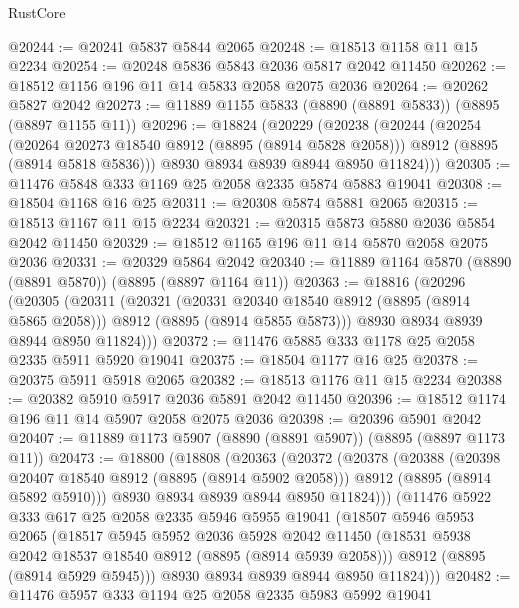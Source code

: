 \begin{lexlean}{RustCore}
\begin{coremodule}
@20244 := @20241 @5837 @5844 @2065
@20248 := @18513 @1158 @11 @15 @2234
@20254 := @20248 @5836 @5843 @2036 @5817 @2042 @11450
@20262 := @18512 @1156 @196 @11 @14 @5833 @2058 @2075 @2036
@20264 := @20262 @5827 @2042
@20273 := @11889 @1155 @5833 (@8890 (@8891 @5833)) (@8895 (@8897 @1155 @11))
@20296 := @18824
    (@20229
      (@20238
        (@20244
          (@20254
            (@20264 @20273 @18540 @8912 (@8895 (@8914 @5828 @2058)))
            @8912
            (@8895 (@8914 @5818 @5836)))
          @8930
          @8934
          @8939
          @8944
          @8950
          @11824)))
@20305 := @11476 @5848 @333 @1169 @25 @2058 @2335 @5874 @5883 @19041
@20308 := @18504 @1168 @16 @25
@20311 := @20308 @5874 @5881 @2065
@20315 := @18513 @1167 @11 @15 @2234
@20321 := @20315 @5873 @5880 @2036 @5854 @2042 @11450
@20329 := @18512 @1165 @196 @11 @14 @5870 @2058 @2075 @2036
@20331 := @20329 @5864 @2042
@20340 := @11889 @1164 @5870 (@8890 (@8891 @5870)) (@8895 (@8897 @1164 @11))
@20363 := @18816
    (@20296
      (@20305
        (@20311
          (@20321
            (@20331 @20340 @18540 @8912 (@8895 (@8914 @5865 @2058)))
            @8912
            (@8895 (@8914 @5855 @5873)))
          @8930
          @8934
          @8939
          @8944
          @8950
          @11824)))
@20372 := @11476 @5885 @333 @1178 @25 @2058 @2335 @5911 @5920 @19041
@20375 := @18504 @1177 @16 @25
@20378 := @20375 @5911 @5918 @2065
@20382 := @18513 @1176 @11 @15 @2234
@20388 := @20382 @5910 @5917 @2036 @5891 @2042 @11450
@20396 := @18512 @1174 @196 @11 @14 @5907 @2058 @2075 @2036
@20398 := @20396 @5901 @2042
@20407 := @11889 @1173 @5907 (@8890 (@8891 @5907)) (@8895 (@8897 @1173 @11))
@20473 := @18800
    (@18808
      (@20363
        (@20372
          (@20378
            (@20388
              (@20398 @20407 @18540 @8912 (@8895 (@8914 @5902 @2058)))
              @8912
              (@8895 (@8914 @5892 @5910)))
            @8930
            @8934
            @8939
            @8944
            @8950
            @11824)))
      (@11476
        @5922
        @333
        @617
        @25
        @2058
        @2335
        @5946
        @5955
        @19041
        (@18507
          @5946
          @5953
          @2065
          (@18517
            @5945
            @5952
            @2036
            @5928
            @2042
            @11450
            (@18531 @5938 @2042 @18537 @18540 @8912 (@8895 (@8914 @5939 @2058)))
            @8912
            (@8895 (@8914 @5929 @5945)))
          @8930
          @8934
          @8939
          @8944
          @8950
          @11824)))
@20482 := @11476 @5957 @333 @1194 @25 @2058 @2335 @5983 @5992 @19041

\end{coremodule}
\end{lexlean}
